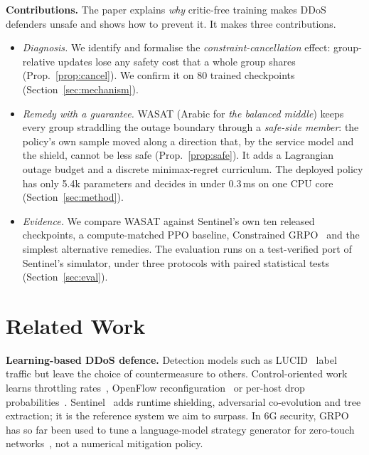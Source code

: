\documentclass[conference]{IEEEtran}
\begin{document}
\textbf{Contributions.} The paper explains \emph{why} critic-free training makes DDoS defenders unsafe and shows how to prevent it. It makes three contributions.
\begin{itemize}
\item \emph{Diagnosis.} We identify and formalise the \emph{constraint-cancellation} effect: group-relative updates lose any safety cost that a whole group shares (Prop.~\ref{prop:cancel}). We confirm it on 80 trained checkpoints (Section~\ref{sec:mechanism}).
\item \emph{Remedy with a guarantee.} WASAT (Arabic for \emph{the balanced middle}) keeps every group straddling the outage boundary through a \emph{safe-side member}: the policy's own sample moved along a direction that, by the service model and the shield, cannot be less safe (Prop.~\ref{prop:safe}). It adds a Lagrangian outage budget and a discrete minimax-regret curriculum. The deployed policy has only 5.4k parameters and decides in under 0.3\,ms on one CPU core (Section~\ref{sec:method}).
\item \emph{Evidence.} We compare WASAT against Sentinel's own ten released checkpoints, a compute-matched PPO baseline, Constrained GRPO~\cite{girgis2026cgrpo} and the simplest alternative remedies. The evaluation runs on a test-verified port of Sentinel's simulator, under three protocols with paired statistical tests (Section~\ref{sec:eval}).
\end{itemize}

\section{Related Work}
\textbf{Learning-based DDoS defence.} Detection models such as LUCID~\cite{doriguzzi2020lucid} label traffic but leave the choice of countermeasure to others. Control-oriented work learns throttling rates~\cite{malialis2015distributed}, OpenFlow reconfiguration~\cite{liu2018drlddos,akbari2020atmos} or per-host drop probabilities~\cite{simpson2020perhost}. Sentinel~\cite{alfatemi2026sentinel} adds runtime shielding, adversarial co-evolution and tree extraction; it is the reference system we aim to surpass. In 6G security, GRPO has so far been used to tune a language-model strategy generator for zero-touch networks~\cite{cao2025secloop}, not a numerical mitigation policy.
\end{document}
